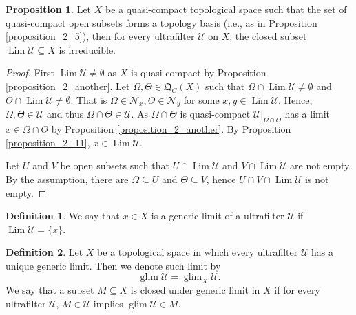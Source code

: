 \documentclass[10pt]{article}
\numberwithin{equation}{section}
\theoremstyle{definition}
\newtheorem{proposition}{Proposition}[subsection]
\newtheorem{definition}{Definition}[subsection]
\DeclareMathOperator{\Lim}{Lim}
\DeclareMathOperator{\glim}{glim}
\newcommand{\U}[0]{\mathcal{U}}
\newcommand{\Nfil}[0]{\mathcal{N}}
\newcommand{\QC}[0]{\mathfrak{Q}_C}
\begin{document}
\begin{proposition}
    \label{proposition_3}
    Let $X$ be a quasi-compact topological space such that the set of quasi-compact open subsets forms a topology basis (i.e., as in Proposition \ref{proposition_2_5}), then for every ultrafilter $\U$ on $X$, the closed subset $\Lim\U\subseteq X$ is irreducible.
\end{proposition}
\begin{proof}
    First $\Lim\U\not=\emptyset$ as $X$ is quasi-compact by Proposition \ref{proposition_2_another}. Let $\Omega,\Theta\in\QC(X)$ such that $\Omega\cap \Lim\U\not=\emptyset$ and $\Theta\cap\Lim\U\not=\emptyset$. That is $\Omega\in\Nfil_x,\Theta\in\Nfil_y$ for some $x,y\in\Lim\U$. Hence, $\Omega,\Theta\in\U$ and thus $\Omega\cap\Theta\in\U$.
    As $\Omega\cap\Theta$ is quasi-compact $\U|_{\Omega\cap\Theta}$ has a limit $x\in\Omega\cap\Theta$ by Proposition \ref{proposition_2_another}. By Proposition \ref{proposition_2_11}, $x\in\Lim\U$.
    \par Let $U$ and $V$ be open subsets such that $U\cap\Lim\U$ and $V\cap\Lim\U$ are not empty. By the assumption, there are $\Omega\subseteq U$ and $\Theta\subseteq V$, hence $U\cap V\cap\Lim\U$ is not empty.
\end{proof}

\begin{definition}
    \label{definition_11}
    We say that $x\in X$ is a generic limit of a ultrafilter $\U$ if $\Lim\U=\overline{\{x\}}$.
\end{definition}

\begin{definition}
    \label{definition_12}
    Let $X$ be a topological space in which every ultrafilter $\U$ has a unique generic limit. Then we denote such limit by
    \begin{equation*}
        \glim\U = \glim_X\U.
    \end{equation*}
    We say that a subset $M\subseteq X$ is closed under generic limit in $X$ if for every ultrafilter $\U$, $M\in\U$ implies $\glim\U\in M$.
\end{definition}
\end{document}

